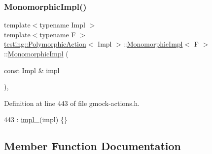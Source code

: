 \subsubsection{\texorpdfstring{Monomorphic\+Impl()}{MonomorphicImpl()}}
{\footnotesize\ttfamily template$<$typename Impl $>$ \\
template$<$typename F $>$ \\
\hyperlink{classtesting_1_1PolymorphicAction}{testing\+::\+Polymorphic\+Action}$<$ Impl $>$\+::\hyperlink{classtesting_1_1PolymorphicAction_1_1MonomorphicImpl}{Monomorphic\+Impl}$<$ F $>$\+::\hyperlink{classtesting_1_1PolymorphicAction_1_1MonomorphicImpl}{Monomorphic\+Impl} (\begin{DoxyParamCaption}\item[{const Impl \&}]{impl }\end{DoxyParamCaption})\hspace{0.3cm}{\ttfamily [inline]}, {\ttfamily [explicit]}}



Definition at line 443 of file gmock-\/actions.\+h.


\begin{DoxyCode}
443 : \hyperlink{classtesting_1_1PolymorphicAction_1_1MonomorphicImpl_a77375e13255f50b45498e0d9c2395d72}{impl\_}(impl) \{\}
\end{DoxyCode}


\subsection{Member Function Documentation}
\mbox{\label{classtesting_1_1PolymorphicAction_1_1MonomorphicImpl_af7b6ce4640aac3dcf7126c4b1e86f277}} 
